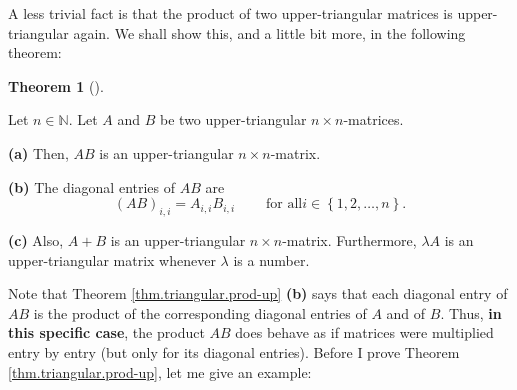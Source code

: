\documentclass[numbers=enddot,12pt,final,onecolumn,notitlepage]{scrartcl}%
\theoremstyle{definition}
\newtheorem{theo}{Theorem}[section]
\newenvironment{theorem}[1][]
{\begin{theo}[#1]\begin{leftbar}}
{\end{leftbar}\end{theo}}
\begin{document}
A less trivial fact is that the product of two upper-triangular matrices is
upper-triangular again. We shall show this, and a little bit more, in the
following theorem:

\begin{theorem}
\label{thm.triangular.prod-up}Let $n\in\mathbb{N}$. Let $A$ and $B$ be two
upper-triangular $n\times n$-matrices.

\textbf{(a)} Then, $AB$ is an upper-triangular $n\times n$-matrix.

\textbf{(b)} The diagonal entries of $AB$ are%
\[
\left(  AB\right)  _{i,i}=A_{i,i}B_{i,i}\ \ \ \ \ \ \ \ \ \ \text{for all
}i\in\left\{  1,2,\ldots,n\right\}  .
\]


\textbf{(c)} Also, $A+B$ is an upper-triangular $n\times n$-matrix.
Furthermore, $\lambda A$ is an upper-triangular matrix whenever $\lambda$ is a number.
\end{theorem}

Note that Theorem \ref{thm.triangular.prod-up} \textbf{(b)} says that each
diagonal entry of $AB$ is the product of the corresponding diagonal entries of
$A$ and of $B$. Thus, \textbf{in this specific case}, the product $AB$ does
behave as if matrices were multiplied entry by entry (but only for its
diagonal entries). Before I prove Theorem \ref{thm.triangular.prod-up}, let me
give an example:
\end{document}
